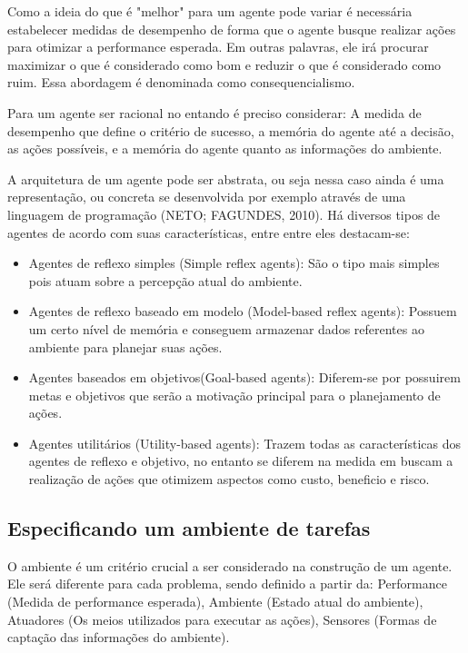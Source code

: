 \documentclass[a4paper,12pt]{article}
\begin{document}
Como a ideia do que é "melhor" para um agente pode variar é necessária estabelecer medidas de desempenho de forma que o agente busque realizar ações para otimizar a performance esperada. Em outras palavras, ele irá procurar maximizar o que é considerado como bom e reduzir o que é considerado como ruim. Essa abordagem é denominada como consequencialismo. 

Para um agente ser racional no entando é preciso considerar: A medida de desempenho que define o critério de sucesso, a memória do agente até a decisão, as ações possíveis, e a memória do agente quanto as informações do ambiente.

A arquitetura de um agente pode ser abstrata, ou seja nessa caso ainda é uma representação, ou concreta se desenvolvida por exemplo através de uma linguagem de programação (NETO; FAGUNDES, 2010). Há diversos tipos de agentes de acordo com suas características, entre entre eles destacam-se: 

\begin{itemize}
    \item Agentes de reflexo simples (Simple reflex agents): São o tipo mais simples pois atuam sobre a percepção atual do ambiente.

    \item Agentes de reflexo baseado em modelo (Model-based reflex agents): Possuem um certo nível de memória e conseguem armazenar dados referentes ao ambiente para planejar suas ações.

    \item Agentes baseados em objetivos(Goal-based agents): Diferem-se por possuirem metas e objetivos que serão a motivação principal para o planejamento de ações.

    \item Agentes utilitários (Utility-based agents): Trazem todas as características dos agentes de reflexo e objetivo, no entanto se diferem na medida em buscam a realização de ações que otimizem aspectos como custo, beneficio e risco.
    
\end{itemize}

\subsection{Especificando um ambiente de tarefas}

O ambiente é um critério crucial a ser considerado na construção de um agente. Ele será diferente para cada problema, sendo definido a partir da: Performance (Medida de performance esperada), Ambiente (Estado atual do ambiente), Atuadores (Os meios utilizados para executar as ações), Sensores (Formas de captação das informações do ambiente).
\end{document}
